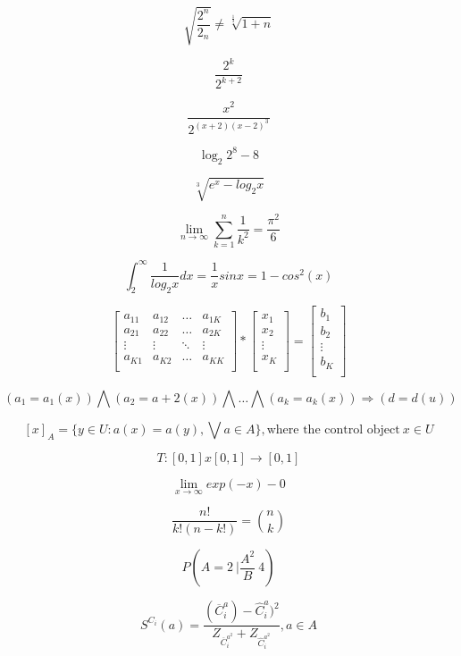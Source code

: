 \documentclass[a4paper]{article}
\begin{document}
$$ \sqrt{ \frac{2^{n}}{2_n}} \neq \sqrt[\frac{1}{3}]{1+n} $$

$$ \frac{2^k}{2^{k+2}} $$

$$ \frac{x^2}{2^{(x+2)(x-2)^3}} $$

$$ \log_2 2^8-8 $$

$$ \sqrt[3]{e^x-log_2x} $$

$$ \lim_{n\to\infty} \sum_{k=1}^{n} \frac{1}{k^2} = \frac{\pi^2}{6}  $$ 

$$ \int_{2}^{\infty} \frac{1}{log_2{x}} dx=\frac{1}{x} sin{x} = 1-cos^2{(x)} $$

$$ \left[\begin{array}{cccc}

a_{11} & a_{12} & \ldots & a_{1K} \\
a_{21} & a_{22} & \ldots & a_{2K} \\
\vdots & \vdots & \ddots & \vdots \\
a_{K1} & a_{K2} & \ldots & a_{KK} \\
\end{array}\right]
*
\left[\begin{array}{c}
x_1 \\
x_2 \\
\vdots \\
x_K \\
\end{array}\right]
{=}
\left[\begin{array} {c}

b_1 \\
b_2 \\
\vdots \\
b_K \\

\end{array} \right]$$

$$ {(a_1=a_1(x))} \bigwedge {(a_2=a+2(x))} \bigwedge {\ldots} \bigwedge {(a_k = a_k(x))} \Rightarrow {(d=d(u))}   $$

$$ [x]_{A} = \{y \in {U} : a{(x) = a(y)}, \bigvee a \in A \}, \textrm {where the control object}\ x \in U $$

$$ T : [0,1]x[0,1] \rightarrow [0,1] $$

$$ \lim_{x \to\infty} exp{(-x)}-0$$

$$ \frac{n!}{k!(n-k!)} = {n \choose k} $$ 

$$ P{\left(A=2 \ |\frac{A^2}{B} \> 4\right)} $$ 


$$ S^{C_i} {(a)} = \frac{(\overline{C}_{i}^{a})-\hat{C}_{i}^{a})^{2}}{Z_{\overline{C}_{i}^{a^2}} + Z_{\hat{C}_{i}^{a^2}}},a \in A  $$
\end{document}
